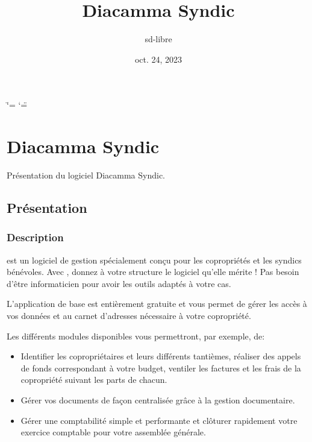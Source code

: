 \documentclass[a4paper,10pt,oneside,french]{sphinxmanual}
\title{Diacamma Syndic}
\date{oct. 24, 2023}
\author{sd-libre}
\begin{document}
\ifdefined\shorthandoff
  \ifnum\catcode`\=\string=\active\shorthandoff{=}\fi
  \ifnum\catcode`\"=\active{}\fi
\fi

\pagestyle{empty}
\sphinxmaketitle
\pagestyle{plain}
\sphinxtableofcontents
\pagestyle{normal}
\label{\detokenize{index::doc}}


\sphinxstepscope


\chapter{Diacamma Syndic}
\label{\detokenize{syndic/index:diacamma-syndic}}\label{\detokenize{syndic/index::doc}}
\sphinxAtStartPar
Présentation du logiciel Diacamma Syndic.

\sphinxstepscope


\section{Présentation}
\label{\detokenize{syndic/presentation:presentation}}\label{\detokenize{syndic/presentation::doc}}

\subsection{Description}
\label{\detokenize{syndic/presentation:description}}
\sphinxAtStartPar
{} est un logiciel de gestion spécialement conçu pour les copropriétés et les syndics bénévoles.
Avec , donnez à votre structure le logiciel qu’elle mérite ! Pas besoin d’être informaticien pour avoir les outils adaptés à votre cas.

\sphinxAtStartPar
L’application de base est entièrement gratuite et vous permet de gérer les accès à vos données et au carnet d’adresses nécessaire à votre copropriété.

\sphinxAtStartPar
Les différents modules disponibles vous permettront, par exemple, de:
\begin{itemize}
\item {} 
\sphinxAtStartPar
Identifier les copropriétaires et leurs différents tantièmes, réaliser des appels de fonds correspondant à votre budget, ventiler les factures et les frais de la copropriété suivant les parts de chacun.

\item {} 
\sphinxAtStartPar
Gérer vos documents de façon centralisée grâce à la gestion documentaire.

\item {} 
\sphinxAtStartPar
Gérer une comptabilité simple et performante et clôturer rapidement votre exercice comptable pour votre assemblée générale.

\end{itemize}
\end{document}
